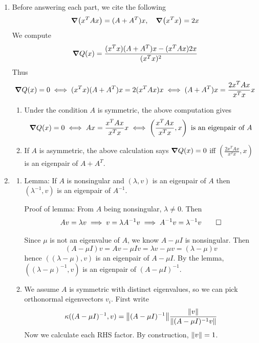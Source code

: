 \documentclass{article}
\newcommand{\br}[1]{\left(#1\right)}
\renewcommand{\l}{\lambda}
\renewcommand{\u}{\mu}
\newcommand{\inv}{^{-1}}
\newcommand{\imp}{\implies}
\begin{document}
\begin{enumerate}
	\pagebreak
	
	
	
	\item Before answering each part, we cite the following
	\[\grad(x^TAx) = (A+A^T)x,
	\quad \grad(x^Tx) = 2x\]
	We compute
	\[\grad Q(x) = \frac{(x^Tx)(A+A^T)x - (x^TAx)2x}{(x^Tx)^2}\]
	Thus
	\[\grad Q(x) = 0
	\iff (x^Tx)(A+A^T)x = 2(x^TAx)x
	\iff (A+A^T)x = \frac{2x^TAx}{x^Tx}x\]
	
	\begin{enumerate}
		
		
		
		
		\item Under the condition $A$ is symmetric, the above computation gives
		\[\grad Q(x) = 0
		\iff Ax = \frac{x^TAx}{x^Tx}x
		\iff \br{\frac{x^TAx}{x^Tx},x} \text{ is an eigenpair of $A$}\]
		
		
		
		\item If $A$ is asymmetric, the above calculation says $\grad Q(x)=0$ iff $\br{\frac{2x^TAx}{x^Tx},x}$ is an eigenpair of $A+A^T$.
		
		
		
		
	\end{enumerate}



	\pagebreak
	
	
	
	\item
	
	\begin{enumerate}
		
		
		
		\item Lemma: If $A$ is nonsingular and $(\l,v)$ is an eigenpair of $A$ then $(\l\inv,v)$ is an eigenpair of $A\inv$.
		
		Proof of lemma: From $A$ being nonsingular, $\l\ne0$. Then
		\[Av = \l v
		\imp v = \l A\inv v
		\imp A\inv v = \l\inv v \qed\]
		
		Since $\u$ is not an eigenvalue of $A$, we know $A-\u I$ is nonsingular. Then
		\[(A-\u I)v = Av - \u Iv
		= \l v - \u v
		= (\l-\u)v\]
		hence $((\l-\u),v)$ is an eigenpair of $A-\u I$. By the lemma, $((\l-\u)\inv,v)$ is an eigenpair of $(A-\u I)\inv$.
		
		
		
		\item We assume $A$ is symmetric with distinct eigenvalues, so we can pick orthonormal eigenvectors $v_i$. First write
		\[\kappa((A-\u I)\inv,v) = \norm{(A-\u I)\inv}\frac{\norm{v}}{\norm{(A-\u I)\inv v}}\]
		Now we calculate each RHS factor. By construction, $\norm{v}=1$.
		

\end{enumerate}
\end{enumerate}
\end{document}
